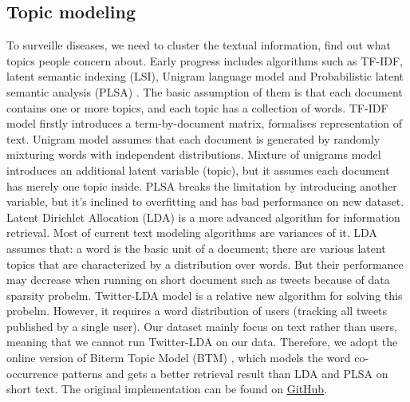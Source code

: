 \subsection{Topic modeling}
\label{sec:topic modeling}
To surveille diseases, we need to cluster the textual information, find out what topics people concern about. Early progress includes algorithms such as TF-IDF, latent semantic indexing (LSI), Unigram language model and Probabilistic latent semantic analysis (PLSA) \cite{hofmann1999probabilistic, baeza1999modern}. The basic assumption of them is that each document contains one or more topics, and each topic has a collection of words.
TF-IDF model firstly introduces a term-by-document matrix, formalises representation of text. Unigram model assumes that each document is generated by randomly mixturing words with independent distributions. Mixture of unigrams model introduces an additional latent variable (topic), but it assumes each document has merely one topic inside\cite{baeza1999modern}. PLSA breaks the limitation by introducing another variable, but it's inclined to overfitting and has bad performance on new dataset. Latent Dirichlet Allocation (LDA) \cite{blei2003latent} is a more advanced algorithm for information retrieval. Most of current text modeling algorithms are variances of it. LDA assumes that: a word is the basic unit of a document; there are various latent topics that are characterized by a distribution over words.  
But their performance may decrease when running on short document such as tweets because of data sparsity probelm. Twitter-LDA model \cite{zhao2011comparing} is a relative new algorithm for solving this probelm. However, it requires a word distribution of users (tracking all tweets published by a single user). Our dataset mainly focus on text rather than users, meaning that we cannot run Twitter-LDA on our data. Therefore, we adopt the online version of Biterm Topic Model (BTM) \cite{yan2013biterm, cheng2014btm}, which models the word co-occurrence patterns and gets a better retrieval result than LDA and PLSA on short text. The original implementation can be found on \href{https://github.com/xiaohuiyan/OnlineBTM}{GitHub}. \\